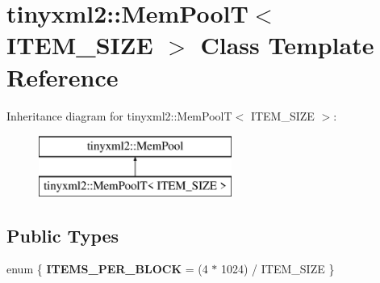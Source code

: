 \hypertarget{classtinyxml2_1_1_mem_pool_t}{}\section{tinyxml2\+:\+:Mem\+PoolT$<$ I\+T\+E\+M\+\_\+\+S\+I\+ZE $>$ Class Template Reference}
\label{classtinyxml2_1_1_mem_pool_t}
Inheritance diagram for tinyxml2\+:\+:Mem\+PoolT$<$ I\+T\+E\+M\+\_\+\+S\+I\+ZE $>$\+:\begin{figure}[H]
\begin{center}
\leavevmode
\includegraphics[height=2.000000cm]{classtinyxml2_1_1_mem_pool_t}
\end{center}
\end{figure}
\subsection*{Public Types}
\begin{DoxyCompactItemize}
\item 
\mbox{\label{classtinyxml2_1_1_mem_pool_t_a04cf45156e6f913f93972869ff8a1d94}} 
enum \{ {\bfseries I\+T\+E\+M\+S\+\_\+\+P\+E\+R\+\_\+\+B\+L\+O\+CK} = (4 $\ast$ 1024) / I\+T\+E\+M\+\_\+\+S\+I\+ZE
 \}
\end{DoxyCompactItemize}
